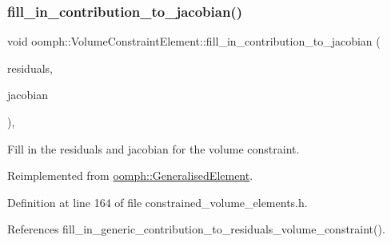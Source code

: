 \subsubsection{\texorpdfstring{fill\+\_\+in\+\_\+contribution\+\_\+to\+\_\+jacobian()}{fill\_in\_contribution\_to\_jacobian()}}
{\footnotesize\ttfamily void oomph\+::\+Volume\+Constraint\+Element\+::fill\+\_\+in\+\_\+contribution\+\_\+to\+\_\+jacobian (\begin{DoxyParamCaption}\item[{\hyperlink{classoomph_1_1Vector}{Vector}$<$ double $>$ \&}]{residuals,  }\item[{\hyperlink{classoomph_1_1DenseMatrix}{Dense\+Matrix}$<$ double $>$ \&}]{jacobian }\end{DoxyParamCaption})\hspace{0.3cm}{\ttfamily [inline]}, {\ttfamily [virtual]}}



Fill in the residuals and jacobian for the volume constraint. 



Reimplemented from \hyperlink{classoomph_1_1GeneralisedElement_a6ae09fc0d68e4309ac1b03583d252845}{oomph\+::\+Generalised\+Element}.



Definition at line 164 of file constrained\+\_\+volume\+\_\+elements.\+h.



References fill\+\_\+in\+\_\+generic\+\_\+contribution\+\_\+to\+\_\+residuals\+\_\+volume\+\_\+constraint().

\mbox{\label{classoomph_1_1VolumeConstraintElement_af2a5a59f7fa5f2570d2d490f3610de61}} 
